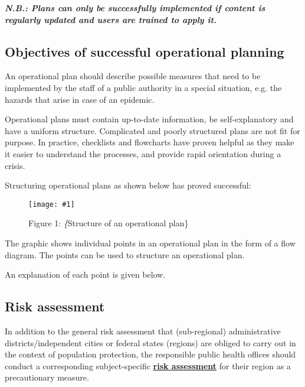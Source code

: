 \documentclass{article}
\newlength{\imgwidth}
\newcommand\scaledgraphics[2]{%
                
\settowidth{\imgwidth}{\texttt{[image: \#1]}}%
                
\setlength{\imgwidth}{\minof{\imgwidth}{#2\textwidth}}%
                
\texttt{[image: \#1]}%
                
}
\begin{document}
\emph{\textbf{N.B.: Plans can only be successfully implemented if content is regularly updated and users are trained to apply it.}}


\subsection{Objectives of successful operational planning}\label{H8776715}



An operational plan should describe possible measures that need to be implemented by the staff of a public authority in a special situation, e.g. the hazards that arise in case of an epidemic.


Operational plans must contain up-to-date information, be self-explanatory and have a uniform structure. Complicated and poorly structured plans are not fit for purpose. In practice, checklists and flowcharts have proven helpful as they make it easier to understand the processes, and provide rapid orientation during a crisis.


Structuring operational plans as shown below has proved successful:

\begin{figure}
\scaledgraphics{4917fd29-2d93-4090-823e-0786d0016fc5.png}{1}
\caption*{Figure 1: \emph\{Structure of an operational plan\}}\label{F85990681}
\end{figure}





The graphic shows individual points in an operational plan in the form of a flow diagram. The points can be used to structure an operational plan.


An explanation of each point is given below.


\subsection{Risk assessment}\label{H2720057}



In addition to the general risk assessment that (sub-regional) administrative districts/independent cities or federal states (regions) are obliged to carry out in the context of population protection, the responsible public health offices should conduct a corresponding subject-specific \textbf{\href{https://www.bbk.bund.de/SharedDocs/Downloads/BBK/DE/Publikationen/Praxis_Bevoelkerungsschutz/PiB_16_Risikoanalyse_im_Bevoelkerungsschutz.pdf}{risk assessment}} for their region as a precautionary measure.
\end{document}
